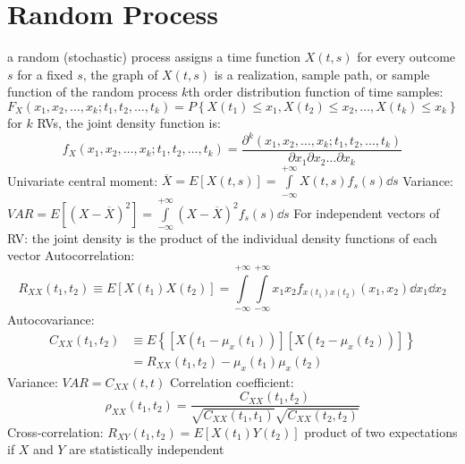 \documentclass[a4paper,11pt]{article}
\begin{document}
	\section{Random Process}
	\begin{outline}[enumerate]
		\1 a random (stochastic) process assigns a time function $X\left(t, s\right)$ for every outcome $s$
		\1 for a fixed $s$, the graph of $X\left( t, s \right)$ is a realization, sample path, or sample function of the random process
		\1 $k$th order distribution function of time samples: 
		\begin{equation}
			F_{X} \left( x_{1}, x_{2}, \ldots, x_{k}; t_{1}, t_{2}, \ldots, t_{k}\right) = P\left\{ X\left(t_{1}\right) \leq x_{1}, X\left(t_{2}\right) \leq x_{2}, \ldots, X\left(t_{k}\right) \leq x_{k} \right\}	
		\end{equation}	
		\1 for $k$ RVs, the joint density function is:
		\begin{equation}
			f_{X} \left( x_{1}, x_{2}, \ldots, x_{k}; t_{1}, t_{2}, \ldots, t_{k}\right) = \frac{\partial^k\left( x_{1}, x_{2}, \ldots, x_{k}; t_{1}, t_{2}, \ldots, t_{k}\right)} {\partial{x_{1}}\partial{x_{2}}\ldots\partial{x_{k}}}
		\end{equation}
		\1 Univariate central moment: $\overline{X} = E\left[X\left(t, s\right) \right] = \int\limits_{-\infty}^{+\infty} X\left(t, s\right)f_{s}\left(s\right) \dd s$ 
		\1 Variance: $VAR = E\left[\left(X - \overline{X }\right)^{2}\right] = \int\limits_{-\infty}^{+\infty} \left(X - \overline{X}\right)^{2} f_{s}\left(s\right) \dd s$
		\1 For independent vectors of RV: the joint density is the product of the individual density functions of each vector
		\1 Autocorrelation: 
		\begin{equation}
			R_{XX}\left(t_{1}, t_{2}\right) \equiv E\left[X\left(t_{1}\right) X \left(t_{2}\right) \right] = \int\limits_{-\infty}^{+\infty} \int\limits_{-\infty}^{+\infty} x_{1} x_{2} f_{x\left(t_{1}\right) x\left(t_{2}\right)} \left(x_{1}, x_{2}\right) \dd x_{1} \dd x_{2}
		\end{equation}
		\1 Autocovariance:
		\begin{align*}
			C_{XX} \left(t_{1}, t_{2}\right) &\equiv E\left\{ \left[X\left(t_{1} - \mu_{x}\left(t_1\right) \right) \right] \left[X\left(t_{2} - \mu_{x}\left(t_2\right) \right) \right] \right\} \\
			&= R_{XX}\left(t_{1}, t_{2}\right) - \mu_{x}\left(t_1\right)\mu_{x}\left(t_2\right)
		\end{align*}
	 	\1 Variance: $VAR = C_{XX}\left(t, t\right)$
	 	\1 Correlation coefficient: 
 		\begin{equation}
 			\rho_{XX} \left(t_{1}, t_{2}\right) = \frac{C_{XX} \left(t_{1}, t_{2}\right)}{\sqrt{C_{XX} \left(t_{1}, t_{1}\right)}\sqrt{C_{XX} \left(t_{2}, t_{2}\right)}}
 		\end{equation}
 	 	\1 Cross-correlation: $R_{XY} \left(t_{1}, t_{2}\right) = E\left[X\left(t_{1}\right) Y\left(t_{2}\right)\right]$
 	 		\2 product of two expectations if $X$ and $Y$ are statistically independent	
	\end{outline}
\end{document}
